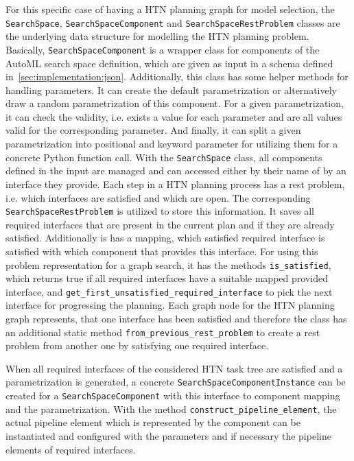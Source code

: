 For this specific case of having a HTN planning graph for model selection, the \texttt{SearchSpace}, \texttt{SearchSpaceComponent} and \texttt{SearchSpaceRestProblem} classes are the underlying data structure for modelling the HTN planning problem.\newline
Basically, \texttt{SearchSpaceComponent} is a wrapper class for components of the AutoML search space definition, which are given as input in a schema defined in~\ref{sec:implementation:json}.
Additionally, this class has some helper methods for handling parameters.
It can create the default parametrization or alternatively draw a random parametrization of this component.
For a given parametrization, it can check the validity, i.e. exists a value for each parameter and are all values valid for the corresponding parameter.
And finally, it can split a given parametrization into positional and keyword parameter for utilizing them for a concrete Python function call.\newline
With the \texttt{SearchSpace} class, all components defined in the input are managed and can accessed either by their name of by an interface they provide.\newline
Each step in a HTN planning process has a rest problem, i.e. which interfaces are satisfied and which are open.
The corresponding \texttt{SearchSpaceRestProblem} is utilized to store this information.
It saves all required interfaces that are present in the current plan and if they are already satisfied.
Additionally is has a mapping, which satisfied required interface is satisfied with which component that provides this interface.
For using this problem representation for a graph search, it has the methods \texttt{is\_satisfied}, which returns true if all required interfaces have a suitable mapped provided interface, and \texttt{get\_first\_unsatisfied\_required\_interface} to pick the next interface for progressing the planning.
Each graph node for the HTN planning graph represents, that one interface has been satisfied and therefore the class has an additional static method \texttt{from\_previous\_rest\_problem} to create a rest problem from another one by satisfying one required interface.

When all required interfaces of the considered HTN task tree are satisfied and a parametrization is generated, a concrete \texttt{SearchSpaceComponentInstance} can be created for a \texttt{SearchSpaceComponent} with this interface to component mapping and the parametrization.
With the method \texttt{construct\_pipeline\_element}, the actual pipeline element which is represented by the component can be instantiated and configured with the parameters and if necessary the pipeline elements of required interfaces.

